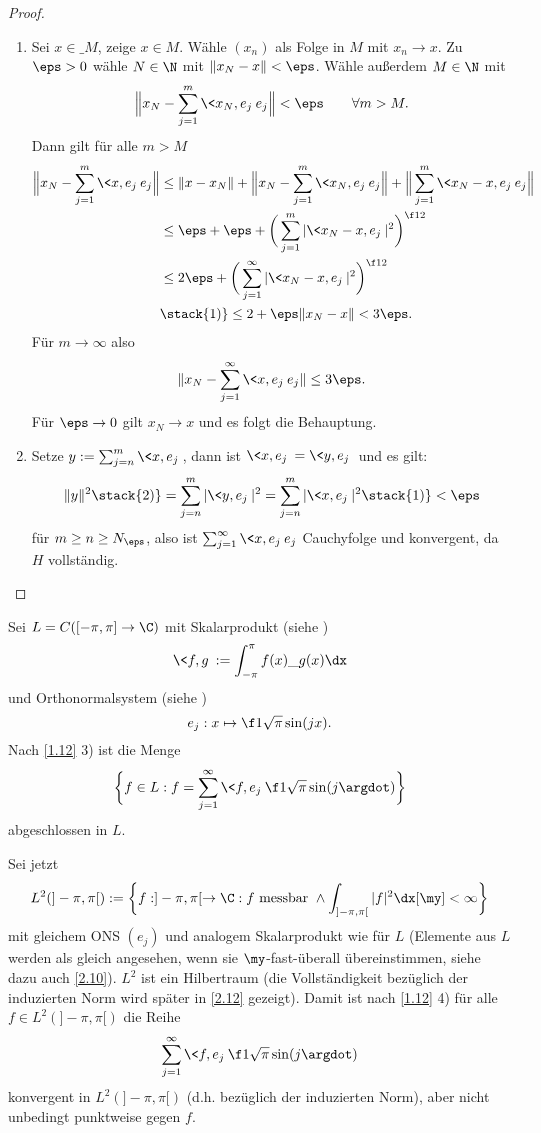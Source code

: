 \begin{st}
\begin{proof}
\begin{enumerate}[1)]
			\item
				Sei $x \in \_M$, zeige $x \in M$.
				Wähle $(x_n)$ als Folge in $M$ mit $x_n \to x$.
				Zu $\eps > 0$ wähle $N\in \N$ mit $\|x_N-x\| < \eps$.
				Wähle außerdem $M \in \N$ mit
				\[
					\Big\|x_N- \sum_{j=1}^m \<x_N,e_j\> e_j \Big\| < \eps
					\qquad \forall m > M.
				\]
				Dann gilt für alle $m > M$
				\begin{align*}
					\Big\|x_N- \sum_{j=1}^m \<x,e_j\> e_j \Big\| 
					&\le \|x-x_N\| + \Big\|x_N - \sum_{j=1}^m \<x_N,e_j\> e_j \Big\| + \Big\| \sum_{j=1}^m \<x_N-x,e_j\> e_j \Big\|	\\
					&\le \eps + \eps + \bigg(\sum_{j=1}^m |\<x_N-x,e_j\>|^2 \bigg)^{\f 12} \\
					&\le 2\eps + \bigg(\sum_{j=1}^\infty |\<x_N-x,e_j\>|^2 \bigg)^{\f 12} \\
					&\stack{1)}\le 2 + \eps\|x_N-x\|
					< 3 \eps.
				\end{align*}
				Für $m \to \infty$ also
				\[
					\|x_N - \sum_{j=1}^\infty \<x,e_j\>e_j \| \le 3\eps.
				\]
				Für $\eps \to 0$ gilt $x_N \to x$ und es folgt die Behauptung.
			\item
				Setze $y := \sum_{j=n}^m \<x,e_j\>$, dann ist $\<x,e_j\> = \<y,e_j\>$ und es gilt:
				\begin{align*}
					\|y\|^2
					\stack{2)}= \sum_{j=n}^m |\<y,e_j\>|^2
					= \sum_{j=n}^m |\<x,e_j\>|^2
					\stack{1)}< \eps
				\end{align*}
				für $m\ge n \ge N_\eps$, also ist $\sum_{j=1}^\infty \<x,e_j\> e_j$ Cauchyfolge und konvergent, da $H$ vollständig.
		\end{enumerate}
	\end{proof}
\end{st}

\begin{ex} \label{1.13}
	Sei $L = C([-\pi,\pi] \to \C)$ mit Skalarprodukt (siehe )
	\[
		\<f,g\> := \int_{-\pi}^{\pi}f(x)\_{g(x)} \dx
	\]
	und Orthonormalsystem (siehe )
	\[
		e_j : x \mapsto \f 1{\sqrt{\pi}} \sin(jx).
	\]
	Nach \ref{1.12} 3) ist die Menge
	\[
		\bigg\{ f \in L : f = \sum_{j=1}^\infty \<f,e_j\> \f 1{\sqrt{\pi}}\sin(j \argdot) \bigg\}
	\]
	abgeschlossen in $L$.

	Sei jetzt
	\[
		L^2(]-\pi,\pi[) := \bigg\{ f: ]-\pi,\pi[ \to \C : f \text{ messbar } \land \int_{]-\pi,\pi[}|f|^2 \dx[\my] < \infty \bigg\}
	\]
	mit gleichem ONS $(e_j)$ und analogem Skalarprodukt wie für $L$ (Elemente aus $L$ werden als gleich angesehen, wenn sie $\my$-fast-überall übereinstimmen, siehe dazu auch \ref{2.10}).
	$L^2$ ist ein Hilbertraum (die Vollständigkeit bezüglich der induzierten Norm wird später in \ref{2.12} gezeigt).
	Damit ist nach \ref{1.12} 4) für alle $f \in L^2(]-\pi,\pi[)$ die Reihe
	\[
		\sum_{j=1}^\infty \<f,e_j\> \f 1{\sqrt{\pi}} \sin(j \argdot)
	\]
	konvergent in $L^2(]-\pi,\pi[)$ (d.h. bezüglich der induzierten Norm), aber nicht unbedingt punktweise gegen $f$.
\end{ex}

